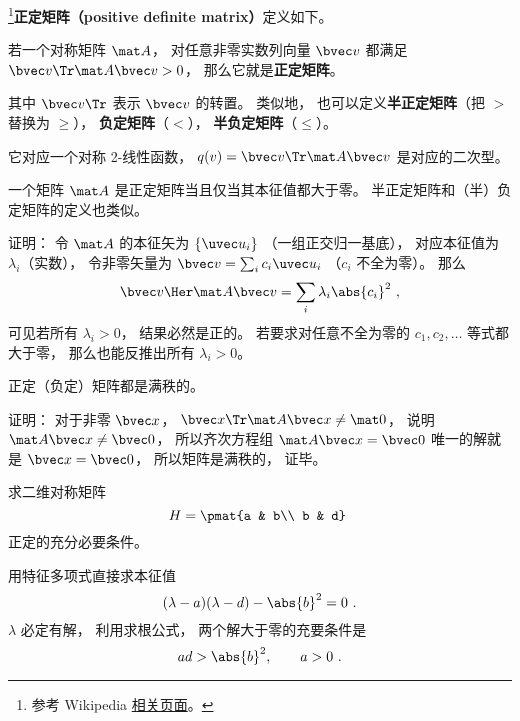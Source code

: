 

\footnote{参考 Wikipedia \href{https://en.wikipedia.org/wiki/Definite_matrix}{相关页面}。}\textbf{正定矩阵（positive definite matrix）}定义如下。
\begin{definition}{}
若一个对称矩阵 $\mat A$， 对任意非零实数列向量 $\bvec v$ 都满足 $\bvec v\Tr \mat A \bvec v > 0$， 那么它就是\textbf{正定矩阵}。
\end{definition}
其中 $\bvec v\Tr$ 表示 $\bvec v$ 的转置。 类似地， 也可以定义\textbf{半正定矩阵}（把 $>$ 替换为 $\geqslant$）， \textbf{负定矩阵}（$<$）， \textbf{半负定矩阵}（$\leqslant$）。

它对应一个对称 2-线性函数， $q(v) = \bvec v\Tr \mat A \bvec v$ 是对应的二次型。

\begin{theorem}{}
一个矩阵 $\mat A$ 是正定矩阵当且仅当其本征值都大于零。 半正定矩阵和（半）负定矩阵的定义也类似。
\end{theorem}

证明： 令 $\mat A$ 的本征矢为 $\{\uvec u_i\}$ （一组正交归一基底）， 对应本征值为 $\lambda_i$（实数）， 令非零矢量为 $\bvec v = \sum_i c_i \uvec u_i$ （$c_i$ 不全为零）。 那么
\begin{equation}
\bvec v\Her \mat A \bvec v = \sum_i \lambda_i \abs{c_i}^2~,
\end{equation}
可见若所有 $\lambda_i > 0$， 结果必然是正的。 若要求对任意不全为零的 $c_1,c_2,\dots$ 等式都大于零， 那么也能反推出所有 $\lambda_i > 0$。

\begin{theorem}{}
正定（负定）矩阵都是满秩的。
\end{theorem}
证明： 对于非零 $\bvec x$， $\bvec x\Tr \mat A \bvec x \ne \mat 0$， 说明 $\mat A\bvec x \ne \bvec 0$， 所以齐次方程组 $\mat A\bvec x = \bvec 0$ 唯一的解就是 $\bvec x = \bvec 0$， 所以矩阵是满秩的， 证毕。

\begin{example}{}
求二维对称矩阵
\begin{equation}
H = \pmat{a & b\\ b & d}~
\end{equation}
正定的充分必要条件。

用特征多项式直接求本征值
\begin{equation}
(\lambda - a)(\lambda - d) - \abs{b}^2 = 0~.
\end{equation}
$\lambda$ 必定有解， 利用求根公式， 两个解大于零的充要条件是
\begin{equation}
ad > \abs{b}^2, \qquad
a > 0~.
\end{equation}
\end{example}

